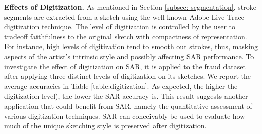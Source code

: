 \noindent\textbf{Effects of Digitization.} As mentioned in Section \ref{subsec: segmentation}, stroke segments are extracted from a sketch using the well-known Adobe Live Trace digitization technique. The level of digitization is controlled by the user to tradeoff faithfulness to the original sketch with compactness of representation. For instance, high levels of digitization tend to smooth out strokes, thus, masking aspects of the artist's intrinsic style and possibly affecting SAR performance. To investigate the effect of digitization on SAR, it is applied to the fraud dataset after applying three distinct levels of digitization on its sketches. We report the average accuracies in Table \ref{table:digitization}. As expected, the higher the digitization level), the lower the SAR accuracy is. This result suggests another application that could benefit from SAR, namely the quantitative assessment of various digitization techniques. SAR can conceivably be used to evaluate how much of the unique sketching style is preserved after digitization.



